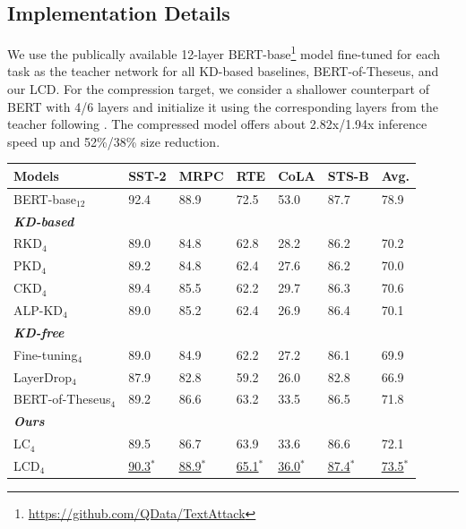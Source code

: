 \subsection{Implementation Details}
We use the publically available 12-layer BERT-base\footnote{\url{https://github.com/QData/TextAttack}} model fine-tuned for each task as the teacher network for all KD-based baselines, BERT-of-Theseus, and our LCD. For the 
compression target, we consider a shallower counterpart of BERT with 4/6 layers and initialize it using the corresponding layers from the teacher following \cite{theseus}. The compressed model offers about 2.82x/1.94x inference speed up and 52\%/38\% size reduction. 

\begin{table}[t]
    \centering
    \scriptsize
    \begin{tabular}{l|lllll|l}
    \toprule
    Models            & SST-2 & MRPC & RTE  & CoLA & STS-B & Avg.  \\
    \midrule
    BERT-base$_{12}$         & 92.4  & 88.9 & 72.5 & 53.0 & 87.7  & 78.9 \\
    \midrule
    \cellcolor[HTML]{EFEFEF}\textbf{\textit{KD-based}}  & & & & & & \\
    RKD$_4$               & 89.0  & 84.8 & 62.8 & 28.2 & 86.2  & 70.2 \\
    PKD$_4$               & 89.2  & 84.8 & 62.4 & 27.6 & 86.2  & 70.0 \\
    CKD$_4$              & 89.4  & 85.5 & 62.2 & 29.7 & 86.3  & 70.6 \\
    ALP-KD$_4$            & 89.0  & 85.2 & 62.4 & 26.9 & 86.4  & 70.1 \\
    \midrule
    \cellcolor[HTML]{EFEFEF}\textbf{\textit{KD-free}}  & & & & & & \\
    Fine-tuning$_4$       & 89.0  & 84.9 & 62.2 & 27.2 & 86.1  & 69.9 \\
    LayerDrop$_4$         & 87.9  & 82.8 & 59.2 & 26.0 & 82.8  & 66.9 \\
    BERT-of-Theseus$_4$   & 89.2  & 86.6 & 63.2 & 33.5 & 86.5  & 71.8 \\
    \midrule
    \cellcolor[HTML]{EFEFEF}\textbf{\textit{Ours}}  & & & & & & \\
    LC$_4$                & 89.5  & 86.7 & 63.9 & 33.6 & 86.6  & 72.1 \\
    LCD$_4$               & \underline{90.3$^*$}  & \underline{88.9$^*$} & \underline{65.1$^*$} & \underline{36.0$^*$} & \underline{87.4$^*$}  & \underline{73.5$^*$} \\

\end{tabular}
\end{table}
